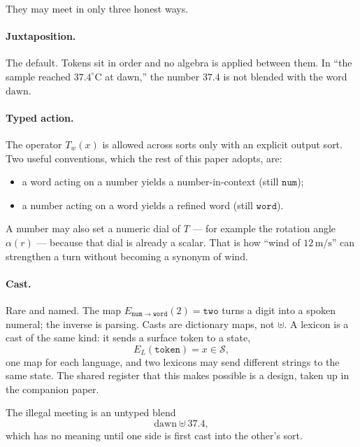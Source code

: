 \documentclass[12pt, a4paper]{article}
\begin{document}
They may meet in only three honest ways.

\paragraph{Juxtaposition.}
The default. Tokens sit in order and no algebra is applied between
them. In ``the sample reached $37.4^\circ\mathrm{C}$ at dawn,'' the
number $37.4$ is not blended with the word $\mathrm{dawn}$.

\paragraph{Typed action.}
The operator $T_w(x)$ is allowed across sorts only with an explicit
output sort. Two useful conventions, which the rest of this paper
adopts, are:
\begin{itemize}
    \item a word acting on a number yields a number-in-context
          (still $\mathtt{num}$);
    \item a number acting on a word yields a refined word
          (still $\mathtt{word}$).
\end{itemize}
A number may also set a numeric dial of $T$ --- for example the
rotation angle $\alpha(r)$ --- because that dial is already a scalar.
That is how ``wind of $12\,\mathrm{m/s}$'' can strengthen a turn
without becoming a synonym of $\mathrm{wind}$.

\paragraph{Cast.}
Rare and named. The map $E_{\mathtt{num}\to\mathtt{word}}(2)=\texttt{two}$
turns a digit into a spoken numeral; the inverse is parsing. Casts are
dictionary maps, not $\uplus$. A lexicon is a cast of the same kind: it sends a surface token to a state,
\begin{equation}
    E_{L}(\texttt{token}) = x\in\mathcal{S},
    \label{eq:lexicon_cast}
\end{equation}
one map for each language, and two lexicons may send different strings to the same state. The shared register that this makes possible is a design, taken up in the companion paper.

The illegal meeting is an untyped blend
\begin{equation}
    \mathrm{dawn} \uplus 37.4,
\end{equation}
which has no meaning until one side is first cast into the other's
sort.
\end{document}
